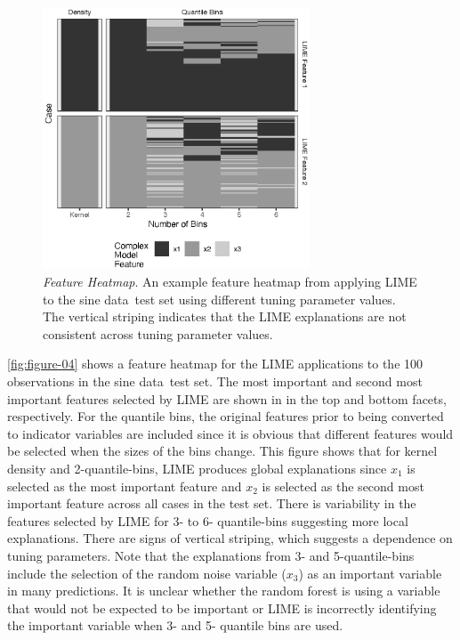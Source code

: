 \documentclass[AMS,STIX2COL]{WileyNJD-v2}\usepackage[]{graphicx}\usepackage[]{color}
\newenvironment{knitrout}{}{} %
\newcommand{\data}{sine data}
\renewcommand{\sout}[1]{\unskip}
\begin{document}
\begin{figure}[!tp]
\begin{knitrout}
\color{fgcolor}

{\centering \includegraphics[width=3.125in]{figure-04-1} 

}



\end{knitrout}
\caption{\emph{Feature Heatmap}. An example feature heatmap  from applying LIME to the \data \ test set using different tuning parameter values. The vertical striping indicates that the LIME explanations are not consistent across tuning parameter values.}
\label{fig:figure-04}
\end{figure}

\autoref{fig:figure-04} shows a feature heatmap for the LIME applications to the 100 observations in the \data \ test set. The most important and second most important features selected by LIME are shown in in the top and bottom facets, respectively. For the quantile bins, the original features prior to being converted to indicator variables are included since it is obvious that different features would be selected when the sizes of the bins change. This figure shows that for kernel density and 2-quantile-bins, LIME produces global explanations since $x_1$ is selected as the most important feature and $x_2$ is selected as the second most important feature across all cases in the test set. There is variability in the features selected by LIME for 3- to 6- quantile-bins suggesting more local explanations. There are signs of vertical striping, which suggests a dependence on tuning parameters. Note that the explanations from 3- and 5-quantile-bins include the selection of the random noise variable ($x_3$) as an important variable in many predictions\sout{, which would not be expected to be important to a random forest}. It is unclear whether the random forest is using a variable that would not be expected to be important or LIME is incorrectly identifying the important variable when 3- and 5- quantile bins are used.
\end{document}
